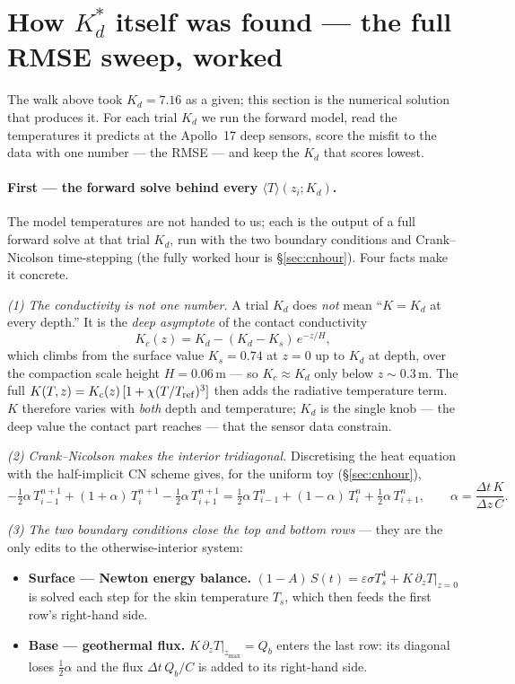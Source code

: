 \documentclass[11pt]{report}
\newcommand{\Tm}{\langle T\rangle}
\begin{document}
\section{How $K_d^{*}$ itself was found --- the full RMSE sweep, worked}\label{app:sweepworked}

The walk above took $K_d=7.16$ as a given; this section is the numerical solution that
produces it. For each trial $K_d$ we run the forward model, read the temperatures it
predicts at the Apollo~17 deep sensors, score the misfit to the data with one number ---
the RMSE --- and keep the $K_d$ that scores lowest.

\paragraph{First --- the forward solve behind every $\Tm(z_i;K_d)$.} The model
temperatures are not handed to us; each is the output of a full forward solve at that
trial $K_d$, run with the two boundary conditions and Crank--Nicolson time-stepping (the
fully worked hour is \S\ref{sec:cnhour}). Four facts make it concrete.

\emph{(1) The conductivity is not one number.} A trial $K_d$ does \emph{not} mean
``$K=K_d$ at every depth.'' It is the \emph{deep asymptote} of the contact conductivity
\[
K_c(z)=K_d-(K_d-K_s)\,e^{-z/H},
\]
which climbs from the surface value $K_s=0.74$ at $z=0$ up to $K_d$ at depth, over the
compaction scale height $H=0.06$\,m --- so $K_c\approx K_d$ only below $z\sim0.3$\,m. The
full $K(T,z)=K_c(z)\,[1+\chi(T/T_{\rm ref})^3]$ then adds the radiative temperature term.
$K$ therefore varies with \emph{both} depth and temperature; $K_d$ is the single knob ---
the deep value the contact part reaches --- that the sensor data constrain.

\emph{(2) Crank--Nicolson makes the interior tridiagonal.} Discretising the heat equation
with the half-implicit CN scheme gives, for the uniform toy (\S\ref{sec:cnhour}),
\[
-\tfrac12\alpha\,T_{i-1}^{n+1}+(1+\alpha)\,T_i^{n+1}-\tfrac12\alpha\,T_{i+1}^{n+1}
=\tfrac12\alpha\,T_{i-1}^{n}+(1-\alpha)\,T_i^{n}+\tfrac12\alpha\,T_{i+1}^{n},
\qquad\alpha=\frac{\Delta t\,K}{\Delta z\,C}.
\]

\emph{(3) The two boundary conditions close the top and bottom rows} --- they are the only
edits to the otherwise-interior system:
\begin{itemize}[leftmargin=1.6em,itemsep=1pt,topsep=2pt]
\item \textbf{Surface --- Newton energy balance.} $(1-A)\,S(t)=\varepsilon\sigma T_s^4
  +K\,\partial_z T|_{z=0}$ is solved each step for the skin temperature $T_s$, which then
  feeds the first row's right-hand side.
\item \textbf{Base --- geothermal flux.} $K\,\partial_z T|_{z_{\max}}=Q_b$ enters the last
  row: its diagonal loses $\tfrac12\alpha$ and the flux $\Delta t\,Q_b/C$ is added to its
  right-hand side.
\end{itemize}
\end{document}
